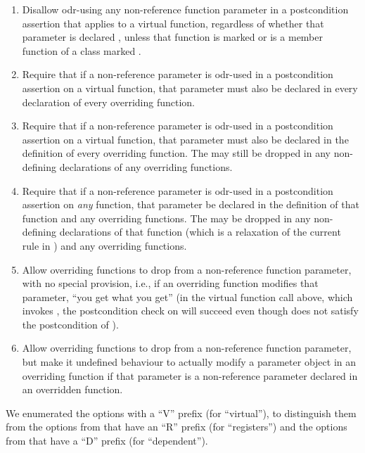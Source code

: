 \renewcommand\labelenumi{V\arabic{enumi}.}
\renewcommand\theenumi\labelenumi
\begin{enumerate}
\item Disallow odr-using any non-reference function parameter in a postcondition assertion that applies to a virtual function, regardless of whether that parameter is declared , unless that function is marked  or is a member function of a class marked .
\item Require that if a non-reference parameter is odr-used in a postcondition assertion on a virtual function, that parameter must also be declared  in every declaration of every overriding function.
\item Require that if a non-reference parameter is odr-used in a postcondition assertion on a virtual function, that parameter must also be declared  in the definition of every overriding function. The  may still be dropped in any non-defining declarations of any overriding functions.
\item Require that if a non-reference parameter is odr-used in a postcondition assertion on \emph{any} function, that parameter be declared  in the definition of that function and any overriding functions. The  may be dropped in any non-defining declarations of that function (which is a relaxation of the current rule in \cite{P2900R10}) and any overriding functions.
\item Allow overriding functions to drop  from a non-reference function parameter, with no special provision, i.e., if an overriding function modifies that parameter, ``you get what you get'' (in the virtual function call above, which invokes , the postcondition check on  will succeed even though  does not satisfy the postcondition of ).
\item Allow overriding functions to drop  from a non-reference function parameter, but make it undefined behaviour to actually modify a parameter object in an overriding function if that parameter is a non-reference parameter declared  in an overridden function.
\end{enumerate}

We enumerated the options with a ``V'' prefix (for ``virtual''), to distinguish them from the options from \cite{P3487R0} that have an ``R'' prefix (for ``registers'') and the options from \cite{P3489R0} that have a ``D'' prefix (for ``dependent'').


